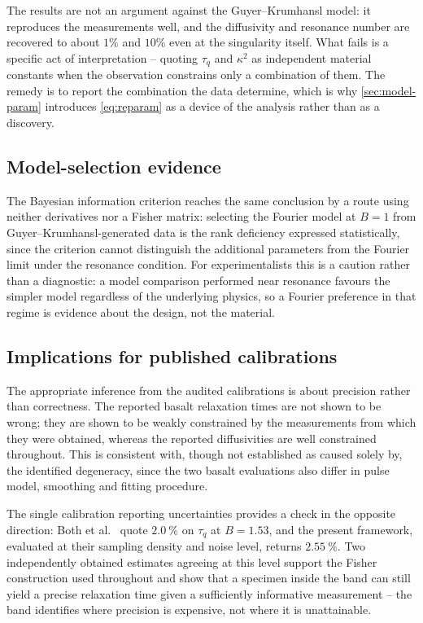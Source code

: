 \documentclass[preprint,12pt,a4paper]{elsarticle}
\theoremstyle{plain}
\theoremstyle{definition}
\theoremstyle{remark}
\newcommand{\tq}{\tau_{q}}
\newcommand{\kk}{\kappa^{2}}
\newcommand{\Bnum}{B}
\begin{document}
The results are not an argument against the Guyer--Krumhansl model: it
reproduces the measurements well, and the diffusivity and resonance number
are recovered to about $1\%$ and $10\%$ even at the singularity itself. What
fails is a specific act of interpretation -- quoting $\tq$ and $\kk$ as
independent material constants when the observation constrains only a
combination of them. The remedy is to report the combination the data
determine, which is why \cref{sec:model-param} introduces \eqref{eq:reparam}
as a device of the analysis rather than as a discovery.

\subsection{Model-selection evidence}
\label{sec:disc-bic}

The Bayesian information criterion reaches the same conclusion by a route
using neither derivatives nor a Fisher matrix: selecting the Fourier model at
$\Bnum=1$ from Guyer--Krumhansl-generated data is the rank deficiency
expressed statistically, since the criterion cannot distinguish the
additional parameters from the Fourier limit under the resonance condition.
For experimentalists this is a caution rather than a diagnostic: a model
comparison performed near resonance favours the simpler model regardless of
the underlying physics, so a Fourier preference in that regime is evidence
about the design, not the material.

\subsection{Implications for published calibrations}
\label{sec:disc-calibration}

The appropriate inference from the audited calibrations is about precision
rather than correctness. The reported basalt relaxation times are not shown
to be wrong; they are shown to be weakly constrained by the measurements from
which they were obtained, whereas the reported diffusivities are well
constrained throughout. This is consistent with, though not established as
caused solely by, the identified degeneracy, since the two basalt evaluations
also differ in pulse model, smoothing and fitting procedure.

The single calibration reporting uncertainties provides a check in the
opposite direction: Both et al.\ \cite{Both2016} quote $\SI{2.0}{\percent}$
on $\tq$ at $\Bnum=1.53$, and the present framework, evaluated at their
sampling density and noise level, returns $\SI{2.55}{\percent}$. Two
independently obtained estimates agreeing at this level support the Fisher
construction used throughout and show that a specimen inside the band can
still yield a precise relaxation time given a sufficiently informative
measurement -- the band identifies where precision is expensive, not where it
is unattainable.
\end{document}
